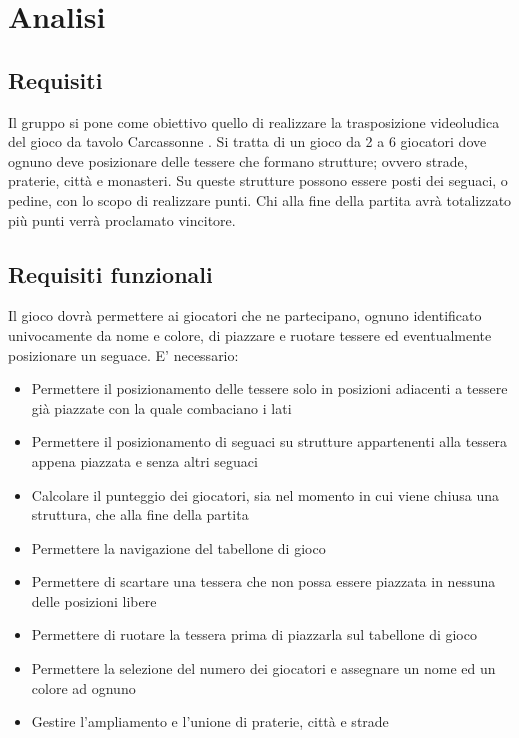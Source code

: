 \section{Analisi}
\subsection{Requisiti}

Il gruppo si pone come obiettivo quello di realizzare la trasposizione videoludica del gioco da tavolo Carcassonne \cite{Carcassonne}. Si tratta di un gioco da 2 a 6 giocatori dove ognuno deve posizionare delle tessere che formano strutture; ovvero strade, praterie, città e monasteri. Su queste strutture possono essere posti dei seguaci, o pedine, con lo scopo di realizzare punti. Chi alla fine della partita avrà totalizzato più punti verrà proclamato vincitore.

\subsection*{Requisiti funzionali}
Il gioco dovrà permettere ai giocatori che ne partecipano, ognuno identificato univocamente da nome e colore, di piazzare e ruotare tessere ed eventualmente posizionare un seguace. E' necessario:

\begin{itemize}
\item Permettere il posizionamento delle tessere solo in posizioni adiacenti a tessere già piazzate con la quale combaciano i lati
\item Permettere il posizionamento di seguaci su strutture appartenenti alla tessera appena piazzata e senza altri seguaci
\item Calcolare il punteggio dei giocatori, sia nel momento in cui viene chiusa una struttura, che alla fine della partita
\item Permettere la navigazione del tabellone di gioco
\item Permettere di scartare una tessera che non possa essere piazzata in nessuna delle posizioni libere
\item Permettere di ruotare la tessera prima di piazzarla sul tabellone di gioco
\item Permettere la selezione del numero dei giocatori e assegnare un nome ed un colore ad ognuno
\item Gestire l'ampliamento e l'unione di praterie, città e strade
\end{itemize}

